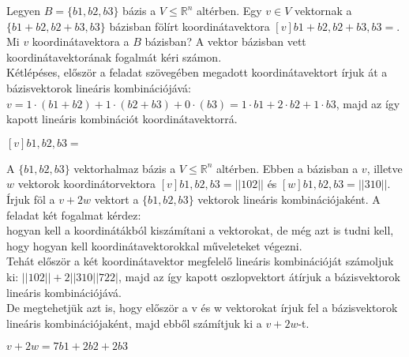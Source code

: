 \begin{frame}
  \begin{tcolorbox}[title={1/2. -R-}]
      Legyen $B = \{b1,b2,b3\}$ bázis a $V \leq \mathbb{R}^n$ altérben. Egy $v \in V$ vektornak a $\{b1 + b2,b2 + b3,b3\}$ bázisban fölírt koordinátavektora $[v]b1+b2,b2+b3,b3 =$.\\
      
      Mi $v$ koordinátavektora a $B$ bázisban?
  \tcblower
    A vektor bázisban vett koordinátavektorának fogalmát kéri számon.\\
   
    Kétlépéses, először a feladat szövegében megadott koordinátavektort írjuk át a bázisvektorok lineáris kombinációjává: $v = 1 \cdot (b1 + b2) + 1 \cdot (b2 + b3) + 0 \cdot (b3) = 1 \cdot b1 + 2 \cdot b2 + 1 \cdot b3$, majd az így kapott lineáris kombinációt koordinátavektorrá.\\
     \mmedskip
     
   $[v]b1,b2,b3 =$ 
  \end{tcolorbox}
\end{frame}

\begin{frame}
  \begin{tcolorbox}[title={1/3. -R-}]
      A $\{b1,b2,b3\}$ vektorhalmaz bázis a $V \leq \mathbb{R}^n$ altérben. Ebben a bázisban a $v$, illetve $w$ vektorok koordinátorvektora $[v]b1,b2,b3 =| | 1 0 2 ||$ és $[w]b1,b2,b3 =| | 3 1 0 ||$. Írjuk föl a $v+2w$ vektort a $\{b1,b2,b3\}$ vektorok lineáris kombinációjaként.
  \tcblower
    A feladat két fogalmat kérdez:\\
      hogyan kell a koordinátákból kiszámítani a vektorokat, de még azt is tudni kell, hogy hogyan kell koordinátavektorokkal műveleteket végezni.\\
      
      Tehát először a két koordinátavektor megfelelő lineáris kombinációját számoljuk ki: $| | 1 0 2  |  |+   2 | | 3 1 0 | | 7 2 2 |$, majd az így kapott oszlopvektort átírjuk a bázisvektorok lineáris kombinációjává.\\
      
      De megtehetjük azt is, hogy először a v és w vektorokat írjuk fel a bázisvektorok lineáris kombinációjaként, majd ebből számítjuk ki a $v+2w$-t.
      
   $v + 2w = 7b1 + 2b2 + 2b3$
  \end{tcolorbox}
\end{frame}
  
